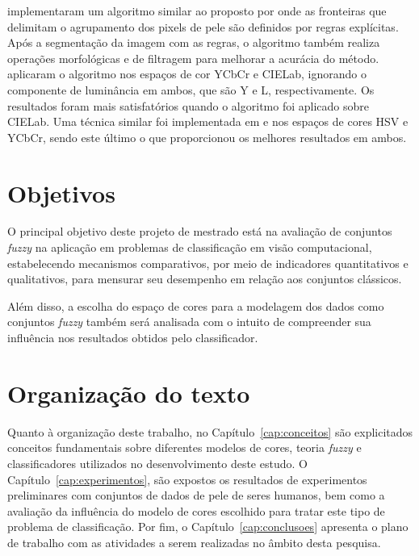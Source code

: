 \citet{kaur:12} implementaram um algoritmo similar ao proposto por \citet{kovac:03} onde as fronteiras que delimitam o agrupamento dos pixels de pele são definidos por regras explícitas. Após a segmentação da imagem com as regras, o algoritmo também realiza operações morfológicas e de filtragem para melhorar a acurácia do método. \citet{kaur:12} aplicaram o algoritmo nos espaços de cor YCbCr e CIELab, ignorando o componente de luminância em ambos, que são Y e L, respectivamente. Os resultados foram mais satisfatórios quando o algoritmo foi aplicado sobre CIELab. Uma técnica similar foi implementada em \citet{shaik:15} e \citet{kumar:15} nos espaços de cores HSV e YCbCr, sendo este último o que proporcionou os melhores resultados em ambos.

\section{Objetivos}
\label{sec:objetivo}

O principal objetivo deste projeto de mestrado está na avaliação de conjuntos \emph{fuzzy} na aplicação em problemas de classificação em visão computacional, estabelecendo mecanismos comparativos, por meio de indicadores quantitativos e qualitativos, para mensurar seu desempenho em relação aos conjuntos clássicos.

Além disso, a escolha do espaço de cores para a modelagem dos dados como conjuntos \emph{fuzzy} também será analisada com o intuito de compreender sua influência nos resultados obtidos pelo classificador.


\section{Organização do texto}
\label{sec:organizacao_trabalho}

Quanto à organização deste trabalho, no Capítulo~\ref{cap:conceitos} são explicitados conceitos fundamentais sobre diferentes modelos de cores, teoria \emph{fuzzy} e classificadores utilizados no desenvolvimento deste estudo. O Capítulo~\ref{cap:experimentos}, são expostos os resultados de experimentos preliminares com conjuntos de dados de pele de seres humanos, bem como a avaliação da influência do modelo de cores escolhido para tratar este tipo de problema de classificação. Por fim, o Capítulo~\ref{cap:conclusoes} apresenta o plano de trabalho com as atividades a serem realizadas no âmbito desta pesquisa.

